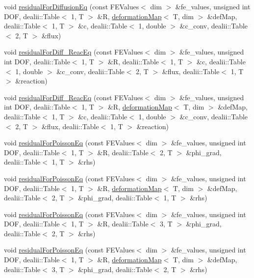 \begin{DoxyCompactItemize}
\item 
void \mbox{\hyperlink{class_residual_a69b8ab1cc85ae177f9c627b60b1b8468}{residual\+For\+Diffusion\+Eq}} (const F\+E\+Values$<$ dim $>$ \&fe\+\_\+values, unsigned int D\+OF, dealii\+::\+Table$<$ 1, T $>$ \&R, \mbox{\hyperlink{structdeformation_map}{deformation\+Map}}$<$ T, dim $>$ \&def\+Map, dealii\+::\+Table$<$ 1, T $>$ \&c, dealii\+::\+Table$<$ 1, double $>$ \&c\+\_\+conv, dealii\+::\+Table$<$ 2, T $>$ \&flux)
\item 
void \mbox{\hyperlink{class_residual_a144663fb81fc60d4db0c5a8e45176e61}{residual\+For\+Diff\+\_\+\+Reac\+Eq}} (const F\+E\+Values$<$ dim $>$ \&fe\+\_\+values, unsigned int D\+OF, dealii\+::\+Table$<$ 1, T $>$ \&R, dealii\+::\+Table$<$ 1, T $>$ \&c, dealii\+::\+Table$<$ 1, double $>$ \&c\+\_\+conv, dealii\+::\+Table$<$ 2, T $>$ \&flux, dealii\+::\+Table$<$ 1, T $>$ \&reaction)
\item 
void \mbox{\hyperlink{class_residual_aa88dcdddfeefb2ba5f1f1196d8608b70}{residual\+For\+Diff\+\_\+\+Reac\+Eq}} (const F\+E\+Values$<$ dim $>$ \&fe\+\_\+values, unsigned int D\+OF, dealii\+::\+Table$<$ 1, T $>$ \&R, \mbox{\hyperlink{structdeformation_map}{deformation\+Map}}$<$ T, dim $>$ \&def\+Map, dealii\+::\+Table$<$ 1, T $>$ \&c, dealii\+::\+Table$<$ 1, double $>$ \&c\+\_\+conv, dealii\+::\+Table$<$ 2, T $>$ \&flux, dealii\+::\+Table$<$ 1, T $>$ \&reaction)
\item 
void \mbox{\hyperlink{class_residual_af1d58eecf6eeae74de2f7ebc6a158b18}{residual\+For\+Poisson\+Eq}} (const F\+E\+Values$<$ dim $>$ \&fe\+\_\+values, unsigned int D\+OF, dealii\+::\+Table$<$ 1, T $>$ \&R, dealii\+::\+Table$<$ 2, T $>$ \&phi\+\_\+grad, dealii\+::\+Table$<$ 1, T $>$ \&rhs)
\item 
void \mbox{\hyperlink{class_residual_ad457db9bcfe7ff4d134642440cd1c4e6}{residual\+For\+Poisson\+Eq}} (const F\+E\+Values$<$ dim $>$ \&fe\+\_\+values, unsigned int D\+OF, dealii\+::\+Table$<$ 1, T $>$ \&R, \mbox{\hyperlink{structdeformation_map}{deformation\+Map}}$<$ T, dim $>$ \&def\+Map, dealii\+::\+Table$<$ 2, T $>$ \&phi\+\_\+grad, dealii\+::\+Table$<$ 1, T $>$ \&rhs)
\item 
void \mbox{\hyperlink{class_residual_ad1d5fc375c6f93d9aad89fc1cf9fd25f}{residual\+For\+Poisson\+Eq}} (const F\+E\+Values$<$ dim $>$ \&fe\+\_\+values, unsigned int D\+OF, dealii\+::\+Table$<$ 1, T $>$ \&R, dealii\+::\+Table$<$ 3, T $>$ \&phi\+\_\+grad, dealii\+::\+Table$<$ 2, T $>$ \&rhs)
\item 
void \mbox{\hyperlink{class_residual_ada0899a86c88ceb84cc3c1155663b8ba}{residual\+For\+Poisson\+Eq}} (const F\+E\+Values$<$ dim $>$ \&fe\+\_\+values, unsigned int D\+OF, dealii\+::\+Table$<$ 1, T $>$ \&R, \mbox{\hyperlink{structdeformation_map}{deformation\+Map}}$<$ T, dim $>$ \&def\+Map, dealii\+::\+Table$<$ 3, T $>$ \&phi\+\_\+grad, dealii\+::\+Table$<$ 2, T $>$ \&rhs)

\end{DoxyCompactItemize}
